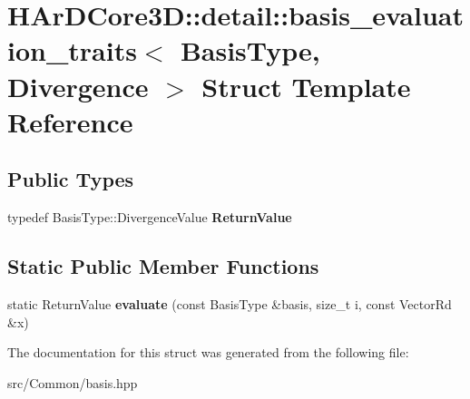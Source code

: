 \hypertarget{structHArDCore3D_1_1detail_1_1basis__evaluation__traits_3_01BasisType_00_01Divergence_01_4}{}\section{H\+Ar\+D\+Core3D\+:\+:detail\+:\+:basis\+\_\+evaluation\+\_\+traits$<$ Basis\+Type, Divergence $>$ Struct Template Reference}
\label{structHArDCore3D_1_1detail_1_1basis__evaluation__traits_3_01BasisType_00_01Divergence_01_4}
\subsection*{Public Types}
\begin{DoxyCompactItemize}
\item 
\mbox{\label{structHArDCore3D_1_1detail_1_1basis__evaluation__traits_3_01BasisType_00_01Divergence_01_4_a1d8393298a710a4a0233017b265119e5}} 
typedef Basis\+Type\+::\+Divergence\+Value {\bfseries Return\+Value}
\end{DoxyCompactItemize}
\subsection*{Static Public Member Functions}
\begin{DoxyCompactItemize}
\item 
\mbox{\label{structHArDCore3D_1_1detail_1_1basis__evaluation__traits_3_01BasisType_00_01Divergence_01_4_afd247472c237f7f2ef7f7cea9f887cd0}} 
static Return\+Value {\bfseries evaluate} (const Basis\+Type \&basis, size\+\_\+t i, const Vector\+Rd \&x)
\end{DoxyCompactItemize}


The documentation for this struct was generated from the following file\+:\begin{DoxyCompactItemize}
\item 
src/\+Common/basis.\+hpp\end{DoxyCompactItemize}
